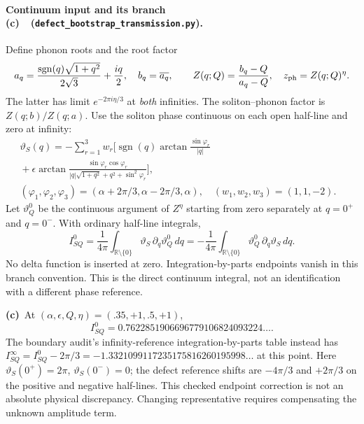 \documentclass[11pt,a4paper]{article}
\newcommand{\C}{\textbf{(c)}\ }
\newcommand{\file}[1]{\nolinkurl{#1}}
\newcommand{\tra}{\file{defect_bootstrap_transmission.py}}
\begin{document}
\paragraph{Continuum input and its branch \C\ (\tra).}
Define phonon roots and the root factor
\begin{equation}
 a_q=\frac{\operatorname{sgn}(q)\sqrt{1+q^2}}{2\sqrt3}+\frac{iq}{2},
 \quad b_q=\overline{a_q},\qquad
 Z(q;Q)=\frac{b_q-Q}{a_q-Q},\quad z_{\rm ph}=Z(q;Q)^\eta.
 \label{Z}
\end{equation}
The latter has limit $e^{-2\pi i\eta/3}$ at \emph{both} infinities.
The soliton--phonon factor is $Z(q;b)/Z(q;a)$.
Use the soliton phase continuous on each open half-line and zero at infinity:
\begin{align}
 \vartheta_S(q)=-\sum_{r=1}^3w_r\Big[\operatorname{sgn}(q)
 \arctan\frac{\sin\varphi_r}{|q|}&\nonumber\\[-1ex]
 {}+\epsilon\arctan\frac{\sin\varphi_r\cos\varphi_r}
 {|q|\sqrt{1+q^2}+q^2+\sin^2\varphi_r}\Big],&\label{thetaS}\\
 (\varphi_1,\varphi_2,\varphi_3)=(\alpha+2\pi/3,\alpha-2\pi/3,\alpha),
 \quad(w_1,w_2,w_3)=(1,1,-2).&\nonumber
\end{align}
Let $\vartheta_Q^0$ be the continuous argument of $Z^\eta$ starting from
zero separately at $q=0^+$ and $q=0^-$. With ordinary half-line integrals,
\begin{equation}
 I_{SQ}^0=\frac1{4\pi}\int_{\mathbb R\setminus\{0\}}
              \vartheta_S\,\partial_q\vartheta_Q^0\,dq
       =-\frac1{4\pi}\int_{\mathbb R\setminus\{0\}}
              \vartheta_Q^0\,\partial_q\vartheta_S\,dq.
 \label{I}
\end{equation}
No delta function is inserted at zero. Integration-by-parts endpoints vanish
in this branch convention. This is the direct continuum integral, not an
identification with a different phase reference.

\C At $(\alpha,\epsilon,Q,\eta)=(.35,+1,.5,+1)$,
\begin{equation}
 I_{SQ}^0=0.7622851906696779106824093224\ldots .\label{bench}
\end{equation}
The boundary audit's infinity-reference integration-by-parts table instead has
$I_{SQ}^{\infty}=I_{SQ}^0-2\pi/3
=-1.3321099117235175816260195998\ldots$ at this point.
Here $\vartheta_S(0^+)=2\pi$, $\vartheta_S(0^-)=0$; the defect reference
shifts are $-4\pi/3$ and $+2\pi/3$ on the positive and negative half-lines.
This checked endpoint correction is not an absolute physical discrepancy.
Changing representative requires compensating the unknown amplitude term.
\end{document}
